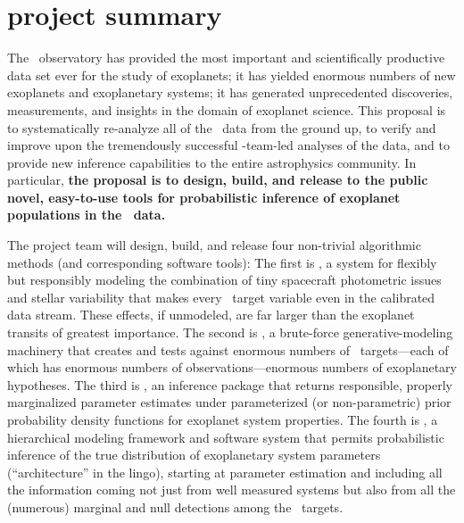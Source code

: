 \documentclass[letterpaper,12pt]{article}
\newcommand{\Untrendy}{\package{Untrendy}}
\newcommand{\Turnstyle}{\package{Turnstyle}}
\newcommand{\Bart}{\package{Bart}}
\newcommand{\TheCreator}{\package{The~Creator}}
\begin{document}
\section*{project summary}

The \Kepler\ observatory has provided the most important and
scientifically productive data set ever for the study of exoplanets;
it has yielded enormous numbers of new exoplanets and exoplanetary
systems; it has generated unprecedented discoveries, measurements, and
insights in the domain of exoplanet science.  This proposal is to
systematically re-analyze all of the \Kepler\ data from the ground up,
to verify and improve upon the tremendously successful
\Kepler-team-led analyses of the data, and to provide new inference
capabilities to the entire astrophysics community.  In particular, \textbf{the
proposal is to design, build, and release to the public novel,
easy-to-use tools for probabilistic inference of exoplanet populations
in the \Kepler\ data.}

The project team will design, build, and release four non-trivial
algorithmic methods (and corresponding software tools): The first is
\Untrendy, a system for flexibly but responsibly modeling the
combination of tiny spacecraft photometric issues and stellar
variability that makes every \Kepler\ target variable even in the
calibrated data stream.  These effects, if unmodeled, are far larger
than the exoplanet transits of greatest importance.  The second is
\Turnstyle, a brute-force generative-modeling machinery that creates
and tests against enormous numbers of \Kepler\ targets---each of which
has enormous numbers of observations---enormous numbers of
exoplanetary hypotheses.  The third is \Bart, an inference package
that returns responsible, properly marginalized parameter estimates
under parameterized (or non-parametric) prior probability density
functions for exoplanet system properties.  The fourth is \TheCreator,
a hierarchical modeling framework and software system that permits
probabilistic inference of the true distribution of exoplanetary
system parameters (``architecture'' in the lingo), starting at
parameter estimation and including all the information coming not just
from well measured systems but also from all the (numerous) marginal
and null detections among the \Kepler\ targets.
\end{document}
